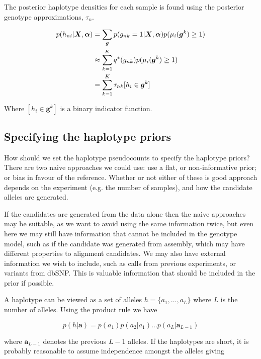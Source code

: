 \documentclass{article}
\begin{document}
The posterior haplotype densities for each sample is found using the posterior genotype approximations, $\tau_{n}$.

\begin{align}
\label{eq:sh_pp}
p(h_{ni} | \boldsymbol{X}, \boldsymbol{\alpha}) &= \sum_{\boldsymbol{g}} p(g_{nk} = 1 | \boldsymbol{X}, \boldsymbol{\alpha}) p(\mu_i(\boldsymbol{g}^k) \ge 1) \notag \\
    &\approx \sum_{k = 1}^K q^*(g_{nk}) p(\mu_i(\boldsymbol{g}^k) \ge 1) \notag \\
    &= \sum_{k = 1}^K \tau_{nk} [h_i \in \boldsymbol{g}^k]
\end{align}

Where $[h_i \in \boldsymbol{g}^k]$ is a binary indicator function.

\subsection{Specifying the haplotype priors}

How should we set the haplotype pseudocounts to specify the haplotype priors? There are two naive approaches we could use: use a flat, or non-informative prior; or bias in favour of the reference. Whether or not either of these is good approach depends on the experiment (e.g. the number of samples), and how the candidate alleles are generated.

If the candidates are generated from the data alone then the naive approaches may be suitable, as we want to avoid using the same information twice, but even here we may still have information that cannot be included in the genotype model, such as if the candidate was generated from assembly, which may have different properties to alignment candidates. We may also have external information we wish to include, such as calls from previous experiments, or variants from dbSNP. This is valuable information that should be included in the prior if possible.

A haplotype can be viewed as a set of alleles $h = \{a_1, \dots, a_L\}$ where $L$ is the number of alleles. Using the product rule we have

\begin{equation}
    p(h | \boldsymbol{a}) = p(a_1)p(a_2 | a_1)\dots p(a_L | \boldsymbol{a}_{L-1})
\end{equation}

where $\boldsymbol{a}_{L-1}$ denotes the previous $L-1$ alleles. If the haplotypes are short, it is probably reasonable to assume independence amongst the alleles giving
\end{document}
